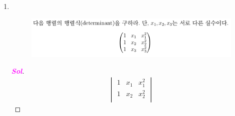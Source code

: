 \documentclass[10pt]{article}
\theoremstyle{definition}
\newcommand{\sol}{\textcolor{magenta}{\bf Sol}}
\newcommand{\norms}[1]{|| #1||}
\renewcommand{\vec}[1]{\textbf{#1}}
\begin{document}
\begin{enumerate}[\bf 1.]
\begin{proof}[\sol]
\begin{enumerate}[(i)]
\begin{align*}
\begin{bmatrix}
		1/2&-1/2&0\\-1/2&1/2&0\\0&0&0
	\end{bmatrix}\begin{bmatrix}
	3\\1\\1
\end{bmatrix}=\begin{bmatrix}
1\\-1\\0
\end{bmatrix}
\end{align*} and then $\displaystyle
\textbf{w}_3:=\frac{\vec{u}_3}{\norms{\vec{u}_3}}=\frac{1}{\sqrt{2}}\begin{bmatrix}
	1\\-1\\0
\end{bmatrix}.$
	\end{enumerate}
	By (i),(ii) and (iii), we have orthonormal basis \[
	\set{\textbf{w}_1,\textbf{w}_2,\textbf{w}_3}=\set{\frac{1}{\sqrt{2}}\begin{bmatrix}
			1\\1\\0
	\end{bmatrix},\begin{bmatrix}
	0\\0\\1
\end{bmatrix},\frac{1}{\sqrt{2}}\begin{bmatrix}
1\\-1\\0
\end{bmatrix}}.
	\]
\end{proof}
\vspace{20pt}
\item \ \begin{figure}[h!]
	\includegraphics[scale=.35]{asgmt1_6.png}
\end{figure}
\begin{proof}[\sol]
\begin{align*}
	{\begin{vmatrix}
		1&x_1&x_1^2\\
		1&x_2&x_2^2\\

\end{vmatrix}}
\end{align*}
\end{proof}
\end{enumerate}
\end{document}
